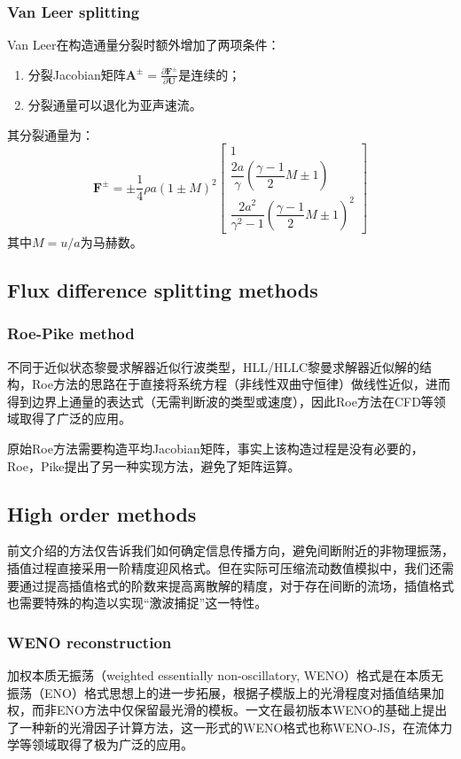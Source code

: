 \documentclass[11pt]{article}
\begin{document}
\subsubsection{Van Leer splitting}
Van Leer在构造通量分裂时额外增加了两项条件：
\begin{enumerate}[label=(\arabic*)]
	\item 分裂Jacobian矩阵$\bm{A}^\pm=\frac{\partial\bm{F}^\pm}{\partial\bm{U}}$是连续的；
	\item 分裂通量可以退化为亚声速流。
\end{enumerate}
其分裂通量为：
\begin{equation}
	\bm{F}^\pm=\pm\dfrac{1}{4}\rho a(1\pm M)^2\left[\begin{matrix}
			1                                                        \\
			\dfrac{2a}{\gamma}\left(\dfrac{\gamma-1}{2}M\pm 1\right) \\
			\dfrac{2a^2}{\gamma^2-1}\left(\dfrac{\gamma-1}{2}M\pm 1\right)^2
		\end{matrix}\right]
\end{equation}
其中$M=u/a$为马赫数。

\subsection{Flux difference splitting methods}
\subsubsection{Roe-Pike method}
不同于近似状态黎曼求解器近似行波类型，HLL/HLLC黎曼求解器近似解的结构，Roe方法的思路在于直接将系统方程（非线性双曲守恒律）做线性近似，进而得到边界上通量的表达式（无需判断波的类型或速度），因此Roe方法在CFD等领域取得了广泛的应用。

原始Roe方法需要构造平均Jacobian矩阵，事实上该构造过程是没有必要的，Roe，Pike提出了另一种实现方法，避免了矩阵运算。

\subsection{High order methods}
前文介绍的方法仅告诉我们如何确定信息传播方向，避免间断附近的非物理振荡，插值过程直接采用一阶精度迎风格式。但在实际可压缩流动数值模拟中，我们还需要通过提高插值格式的阶数来提高离散解的精度，对于存在间断的流场，插值格式也需要特殊的构造以实现“激波捕捉”这一特性。

\subsubsection{WENO reconstruction}
加权本质无振荡（weighted essentially non-oscillatory, WENO）格式\citep{liu_weighted_1994}是在本质无振荡（ENO）格式思想上的进一步拓展，根据子模版上的光滑程度对插值结果加权，而非ENO方法中仅保留最光滑的模板。\citet{jiang_efficient_1996}一文在最初版本WENO的基础上提出了一种新的光滑因子计算方法，这一形式的WENO格式也称WENO-JS，在流体力学等领域取得了极为广泛的应用。
\end{document}
